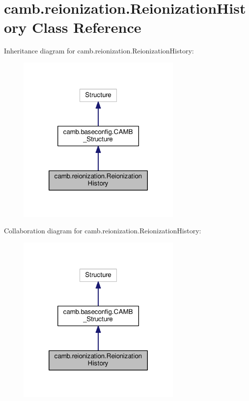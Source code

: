 \hypertarget{classcamb_1_1reionization_1_1ReionizationHistory}{}\section{camb.\+reionization.\+Reionization\+History Class Reference}
\label{classcamb_1_1reionization_1_1ReionizationHistory}


Inheritance diagram for camb.\+reionization.\+Reionization\+History\+:
\nopagebreak
\begin{figure}[H]
\begin{center}
\leavevmode
\includegraphics[width=228pt]{classcamb_1_1reionization_1_1ReionizationHistory__inherit__graph}
\end{center}
\end{figure}


Collaboration diagram for camb.\+reionization.\+Reionization\+History\+:
\nopagebreak
\begin{figure}[H]
\begin{center}
\leavevmode
\includegraphics[width=228pt]{classcamb_1_1reionization_1_1ReionizationHistory__coll__graph}
\end{center}
\end{figure}
